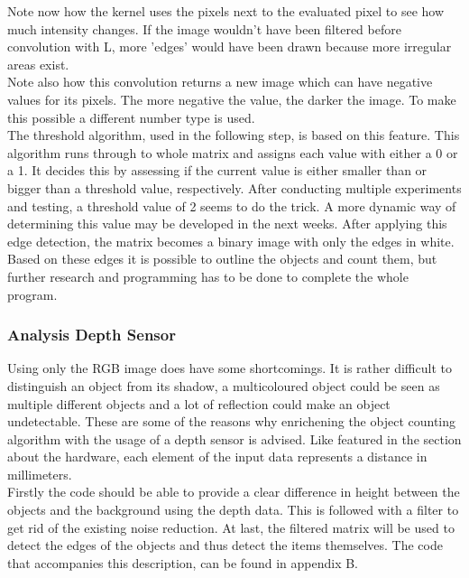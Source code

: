 \documentclass[11pt]{article}
\begin{document}
\noindent Note now how the kernel uses the pixels next to the evaluated pixel to see how much intensity changes. If the image wouldn't have been filtered before convolution with L, more 'edges' would have been drawn because more irregular areas exist.\\
Note also how this convolution returns a new image which can have negative values for its pixels. The more negative the value, the darker the image. To make this possible a different number type is used.\\
The threshold algorithm, used in the following step, is based on this feature. This algorithm runs through to whole matrix and assigns each value with either a 0 or a 1. It decides this by assessing if the current value is either smaller than or bigger than a threshold value, respectively. After conducting multiple experiments and testing, a threshold value of 2 seems to do the trick. A more dynamic way of determining this value may be developed in the next weeks. After applying this edge detection, the matrix becomes a binary image with only the edges in white. Based on these edges it is possible to outline the objects and count them, but further research and programming has to be done to complete the whole program.

\subsubsection{Analysis Depth Sensor}
Using only the RGB image does have some shortcomings. It is rather difficult to distinguish an object from its shadow, a multicoloured object could be seen as multiple different objects and a lot of reflection could make an object undetectable. These are some of the reasons why enrichening the object counting algorithm with the usage of a depth sensor is advised. Like featured in the section about the hardware, each element of the input data represents a distance in millimeters.\\
Firstly the code should be able to provide a clear difference in height between the objects and the background using the depth data. This is followed with a filter to get rid of the existing noise reduction. At last, the filtered matrix will be used to detect the edges of the objects and thus detect the items themselves. The code that accompanies this description, can be found in appendix B.
 
\end{document}
